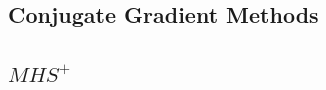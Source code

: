 \begin{appendices}
        \section{Conjugate Gradient Methods} %
        \label{sec:conjugate_gradient_methods}

            \subsection{$MHS^+$} %
            \label{sub:mhs}

                \begin{figure}[H]
                    \centering
                    \begin{subfigure}{0.60\textwidth}
                        \caption{}
                        \label{fig:monks_1_MSE_CGD_MHS}
                    \end{subfigure}
                    \begin{subfigure}{0.60\textwidth}
                        \resizebox{\textwidth}{!}{
}
\end{subfigure}
\end{figure}
\end{appendices}
